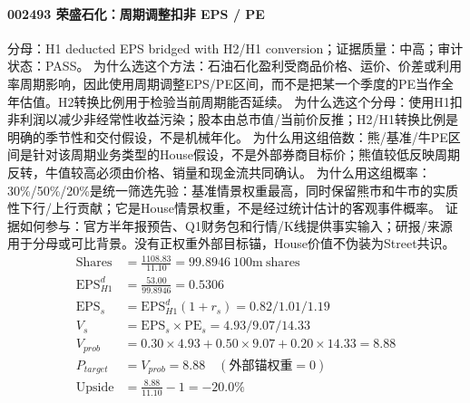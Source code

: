 \paragraph{002493 荣盛石化：周期调整扣非 EPS / PE}
分母：H1 deducted EPS bridged with H2/H1 conversion；证据质量：中高；审计状态：PASS。
为什么选这个方法：石油石化盈利受商品价格、运价、价差或利用率周期影响，因此使用周期调整EPS/PE区间，而不是把某一个季度的PE当作全年估值。H2转换比例用于检验当前周期能否延续。
为什么选这个分母：使用H1扣非利润以减少非经常性收益污染；股本由总市值/当前价反推；H2/H1转换比例是明确的季节性和交付假设，不是机械年化。
为什么用这组倍数：熊/基准/牛PE区间是针对该周期业务类型的House假设，不是外部券商目标价；熊值较低反映周期反转，牛值较高必须由价格、销量和现金流共同确认。
为什么用这组概率：30\%/50\%/20\%是统一筛选先验：基准情景权重最高，同时保留熊市和牛市的实质性下行/上行贡献；它是House情景权重，不是经过统计估计的客观事件概率。
证据如何参与：官方半年报预告、Q1财务包和行情/K线提供事实输入；研报/来源用于分母或可比背景。没有正权重外部目标锚，House价值不伪装为Street共识。
\begin{align*}
\mathrm{Shares} &= \frac{1108.83}{11.10}=99.8946\ \mathrm{100m\ shares}\\
\mathrm{EPS}_{H1}^d &= \frac{53.00}{99.8946}=0.5306\\
\mathrm{EPS}_s &= \mathrm{EPS}_{H1}^d(1+r_s)=0.82/1.01/1.19\\
V_s &= \mathrm{EPS}_s\times \mathrm{PE}_s=4.93/9.07/14.33\\
V_{prob} &= 0.30\times 4.93+0.50\times 9.07+0.20\times 14.33=8.88\\
P_{target} &= V_{prob}=8.88\quad(\text{外部锚权重}=0)\\
\mathrm{Upside} &= \frac{8.88}{11.10}-1=-20.0\%\\
\end{align*}

